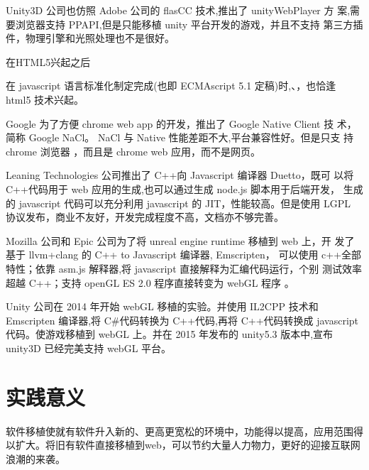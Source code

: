 Unity3D 公司也仿照 Adobe 公司的 flasCC 技术,推出了 unityWebPlayer 方
案,需要浏览器支持 PPAPI,但是只能移植 unity 平台开发的游戏，并且不支持
第三方插件，物理引擎和光照处理也不是很好。

在HTML5兴起之后

在 javascript 语言标准化制定完成(也即 ECMAscript 5.1 定稿)时,、，也恰逢
html5 技术兴起。

Google 为了方便 chrome web app 的开发，推出了 Google Native Client 技
术，简称 Google NaCl。
NaCl 与 Native 性能差距不大,平台兼容性好。但是只支
持 chrome 浏览器 ，而且是 chrome web 应用，而不是网页。

Leaning Technologies 公司推出了 C++向 Javascript 编译器 Duetto，既可
以将 C++代码用于 web 应用的生成,也可以通过生成 node.js 脚本用于后端开发，
生成的 javascript 代码可以充分利用 javascript 的 JIT，性能较高。但是使用
LGPL 协议发布，商业不友好，开发完成程度不高，文档亦不够完善。

Mozilla 公司和 Epic 公司为了将 unreal engine runtime 移植到 web 上，开
发了基于 llvm+clang 的 C++ to Javascript 编译器, Emscripten，
可以使用 c++全部特性；依靠 asm.js 解释器,将 javascript 直接解释为汇编代码运行，个别
测试效率超越 C++；支持 openGL ES 2.0 程序直接转变为 webGL 程序 。

Unity 公司在 2014 年开始 webGL 移植的实验。并使用 IL2CPP 技术和 Emscripten 编译器,将 C\#代码转换为 C++代码,再将 C++代码转换成 javascript 代码。使游戏移植到 webGL 上。并在 2015 年发布的 unity5.3 版本中,宣布 unity3D 已经完美支持 webGL 平台。

\section{实践意义}

软件移植使就有软件升入新的、更高更宽松的环境中，功能得以提高，应用范围得以扩大。将旧有软件直接移植到web，可以节约大量人力物力，更好的迎接互联网浪潮的来袭。